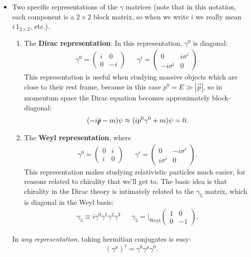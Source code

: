 \documentclass[12pt, oneside]{article}   	%
\theoremstyle{definition}
\begin{document}
\begin{itemize}
	\item Two specific representations of the $\gamma$ matrices (note that in this notation, each component is a $2\times 2$ block matrix, so when we write $i$ we really mean $i\, 1_{2\times 2}$, etc.). 
	\begin{enumerate}
		\item The \textbf{Dirac representation}: In this representation, $\gamma^0$ is diagonal:
		\begin{align}
			\gamma^0 = \begin{pmatrix} i & 0 \\ 0 & -i \end{pmatrix} && \gamma^i = \begin{pmatrix} 0 & i\sigma^i \\ -i\sigma^i & 0 \end{pmatrix}.
		\end{align}
		This representation is useful when studying massive objects which are close to their rest frame, because in this case $p^0 = E\gg |\vec p|$, so in momentum space the Dirac equation becomes approximately block-diagonal:
		\begin{equation}
			(-i\slashed p - m)\psi \approx (i p^0 \gamma^0 + m)\psi = 0.
		\end{equation}
		\item The \textbf{Weyl representation}, where 
		\begin{align}
			\gamma^0 = \begin{pmatrix} 0 & i \\ i & 0 \end{pmatrix} && \gamma^i = \begin{pmatrix} 0 & -i\sigma^i \\ i\sigma^i & 0 \end{pmatrix}.
		\end{align}
		This representation makes studying relativistic particles much easier, for reasons related to chirality that we'll get to. The basic idea is that chirality in the Dirac theory is intimately related to the $\gamma_5$ matrix, which is diagonal in the Weyl basis:
		\begin{align}
			\gamma_5 \equiv i \gamma^0 \gamma^1 \gamma^2 \gamma^3 && \gamma_5 =\bigg|_{\mathrm{Weyl}} \begin{pmatrix} 1 & 0 \\ 0 & -1 \end{pmatrix}.
		\end{align}
	\end{enumerate}
	In \textit{any representation}, taking hermitian conjugates is easy:
	\begin{equation}
		(\gamma^\mu)^\dagger = \gamma^0 \gamma^\mu \gamma^0.
	\end{equation}
	

\end{itemize}
\end{document}
